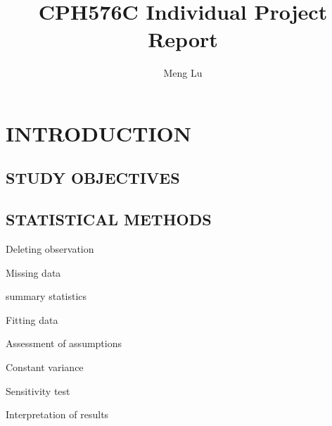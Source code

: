 \documentclass{article}
\begin{document}
 



\title{CPH576C Individual Project Report}
\author{\small{Meng Lu}}


\maketitle
\begin{abstract}
  
\end{abstract}  
\section{INTRODUCTION}
\label{sec:Introduction}


\subsection{STUDY OBJECTIVES}
\label{sec:Study Objectives}

                
            
\subsection{STATISTICAL METHODS}
\label{sec:Statistical Methods}
    Deleting observation
    
    
    
    Missing data
    
    
    
    summary statistics
    
    
    
    Fitting data
    
    
    
    Assessment of assumptions
    
    
    
    
    Constant variance
    
    
    
    
    Sensitivity test
    
    
    Interpretation of results
    
    
    
\end{document}
